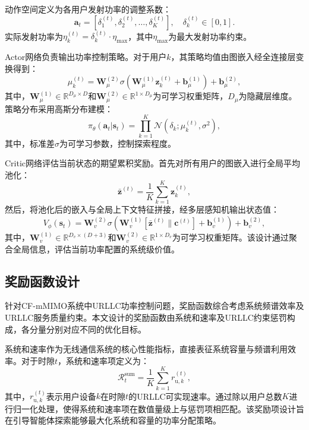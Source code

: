 动作空间定义为各用户发射功率的调整系数：
\begin{equation}
\mathbf{a}_{t} = \left[\delta_{1}^{(t)}, \delta_{2}^{(t)}, \ldots, \delta_{K}^{(t)}\right], \quad \delta_{k}^{(t)} \in [0, 1].
\end{equation}
实际发射功率为$\eta_{k}^{(t)} = \delta_{k}^{(t)} \cdot \eta_{\max}$，其中$\eta_{\max}$为最大发射功率约束。

Actor网络负责输出功率控制策略。对于用户$k$，其策略均值由图嵌入经全连接层变换得到：
\begin{equation}
\mu_{k}^{(t)} = \mathbf{W}_{\mu}^{(2)} \sigma\left(\mathbf{W}_{\mu}^{(1)} \mathbf{z}_{k}^{(t)} + \mathbf{b}_{\mu}^{(1)}\right) + \mathbf{b}_{\mu}^{(2)},
\end{equation}
其中，$\mathbf{W}_{\mu}^{(1)} \in \mathbb{R}^{D_{\mu} \times D}$和$\mathbf{W}_{\mu}^{(2)} \in \mathbb{R}^{1 \times D_{\mu}}$为可学习权重矩阵，$D_{\mu}$为隐藏层维度。策略分布采用高斯分布建模：
\begin{equation}
\pi_{\theta}(\mathbf{a}_{t}|\mathbf{s}_{t}) = \prod_{k=1}^{K} \mathcal{N}\left(\delta_{k}; \mu_{k}^{(t)}, \sigma^{2}\right),
\end{equation}
其中，标准差$\sigma$为可学习参数，控制探索程度。

Critic网络评估当前状态的期望累积奖励。首先对所有用户的图嵌入进行全局平均池化：
\begin{equation}
\bar{\mathbf{z}}^{(t)} = \frac{1}{K}\sum_{k=1}^{K}\mathbf{z}_{k}^{(t)},
\end{equation}
然后，将池化后的嵌入与全局上下文特征拼接，经多层感知机输出状态值：
\begin{equation}
V_{\phi}(\mathbf{s}_{t}) = \mathbf{W}_{v}^{(2)} \sigma\left(\mathbf{W}_{v}^{(1)} \left[\bar{\mathbf{z}}^{(t)} \| \mathbf{c}^{(t)}\right] + \mathbf{b}_{v}^{(1)}\right) + \mathbf{b}_{v}^{(2)},
\end{equation}
其中，$\mathbf{W}_{v}^{(1)} \in \mathbb{R}^{D_{v} \times (D+3)}$和$\mathbf{W}_{v}^{(2)} \in \mathbb{R}^{1 \times D_{v}}$为可学习权重矩阵。该设计通过聚合全局信息，评估当前功率配置的系统级价值。

\subsection{奖励函数设计}
针对CF-mMIMO系统中URLLC功率控制问题，奖励函数综合考虑系统频谱效率及URLLC服务质量约束。本文设计的奖励函数由系统和速率及URLLC约束惩罚构成，各分量分别对应不同的优化目标。

系统和速率作为无线通信系统的核心性能指标，直接表征系统容量与频谱利用效率。对于时隙$t$，系统和速率项定义为：
\begin{equation}
\mathcal{R}_{t}^{\text{sum}} = \frac{1}{K} \sum_{k=1}^{K} r_{\text{u},k}^{(t)},
\end{equation}
其中，$r_{\text{u},k}^{(t)}$表示用户设备$k$在时隙$t$的URLLC可实现速率。通过除以用户总数$K$进行归一化处理，使得系统和速率项在数值量级上与惩罚项相匹配。该奖励项设计旨在引导智能体探索能够最大化系统和容量的功率分配策略。

